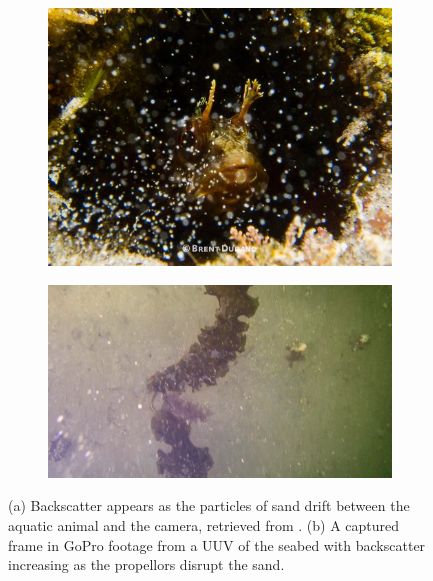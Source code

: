 \begin{figure}[h]
    \centering
    \begin{subfigure}{.25\textwidth}
        \centering
        \includegraphics[width=1\linewidth]{assets/backscatter_article_durand2.jpg}
        \caption{}
    \end{subfigure}
    \qquad
    \begin{subfigure}{.34\textwidth}
        \centering
        \includegraphics[width=1\linewidth]{assets/backscatter_test_vid.png}
        \caption{}
    \end{subfigure}
    \caption{(a) Backscatter appears as the particles of sand drift between the aquatic animal and the camera, retrieved from \cite{brentdurandEasyWaysEliminate2013}. (b) A captured frame in GoPro footage from a UUV of the seabed with backscatter increasing as the propellors disrupt the sand.}
    \label{fig:backscatter}
\end{figure}

